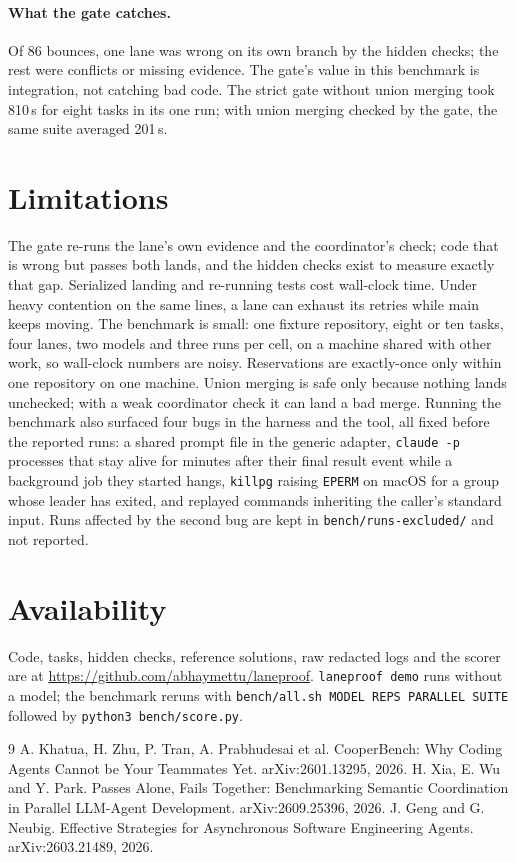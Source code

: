 \documentclass[11pt]{article}
\begin{document}
\paragraph{What the gate catches.} Of 86 bounces, one lane was wrong on its own branch by the hidden checks; the rest
were conflicts or missing evidence. The gate's value in this benchmark is integration, not catching bad code. The
strict gate without union merging took 810\,s for eight tasks in its one run; with union merging checked by the
gate, the same suite averaged 201\,s.

\section{Limitations}
The gate re-runs the lane's own evidence and the coordinator's check; code that is wrong but passes both lands, and
the hidden checks exist to measure exactly that gap. Serialized landing and re-running tests cost wall-clock time.
Under heavy contention on the same lines, a lane can exhaust its retries while main keeps moving. The benchmark is
small: one fixture repository, eight or ten tasks, four lanes, two models and three runs per cell, on a machine
shared with other work, so wall-clock numbers are noisy. Reservations are exactly-once only within one repository on
one machine. Union merging is safe only because nothing lands unchecked; with a weak coordinator check it can land a
bad merge. Running the benchmark also surfaced four bugs in the harness and the tool, all fixed before the reported
runs: a shared prompt file in the generic adapter, \texttt{claude -p} processes that stay alive for minutes after
their final result event while a background job they started hangs, \texttt{killpg} raising \texttt{EPERM} on macOS
for a group whose leader has exited, and replayed commands inheriting the caller's standard input. Runs affected by
the second bug are kept in \texttt{bench/runs-excluded/} and not reported.

\section{Availability}
Code, tasks, hidden checks, reference solutions, raw redacted logs and the scorer are at
\url{https://github.com/abhaymettu/laneproof}. \texttt{laneproof demo} runs without a model; the benchmark reruns with
\texttt{bench/all.sh MODEL REPS PARALLEL SUITE} followed by \texttt{python3 bench/score.py}.

\begin{thebibliography}{9}
 A. Khatua, H. Zhu, P. Tran, A. Prabhudesai et al. CooperBench: Why Coding Agents Cannot be Your Teammates Yet. arXiv:2601.13295, 2026.
 H. Xia, E. Wu and Y. Park. Passes Alone, Fails Together: Benchmarking Semantic Coordination in Parallel LLM-Agent
Development. arXiv:2609.25396, 2026.
 J. Geng and G. Neubig. Effective Strategies for Asynchronous Software Engineering Agents. arXiv:2603.21489, 2026.
\end{thebibliography}
\end{document}

